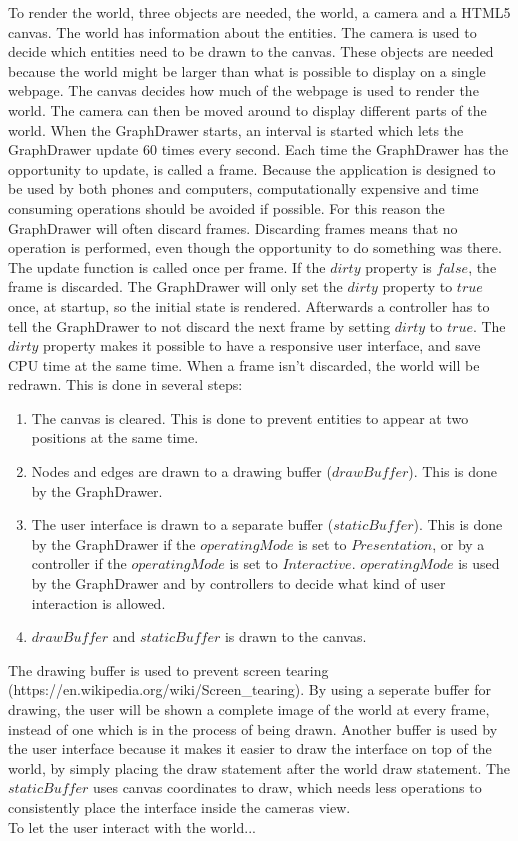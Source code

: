 To render the world, three objects are needed, the world, a camera and a HTML5 canvas. The world has information about the entities. The camera is used to decide which entities need to be drawn to the canvas. These objects are needed because the world might be larger than what is possible to display on a single webpage. The canvas decides how much of the webpage is used to render the world. The camera can then be moved around to display different parts of the world. When the GraphDrawer starts, an interval is started which lets the GraphDrawer update 60 times every second. Each time the GraphDrawer has the opportunity to update, is called a frame. Because the application is designed to be used by both phones and computers, computationally expensive and time consuming operations should be avoided if possible. For this reason the GraphDrawer will often discard frames. Discarding frames means that no operation is performed, even though the opportunity to do something was there. The update function is called once per frame. If the $dirty$ property is $false$, the frame is discarded. The GraphDrawer will only set the $dirty$ property to $true$ once, at startup, so the initial state is rendered. Afterwards a controller has to tell the GraphDrawer to not discard the next frame by setting $dirty$ to $true$. The $dirty$ property makes it possible to have a responsive user interface, and save CPU time at the same time. When a frame isn't discarded, the world will be redrawn. This is done in several steps:
\begin{enumerate}
    \item The canvas is cleared. This is done to prevent entities to appear at two positions at the same time.
    \item Nodes and edges are drawn to a drawing buffer ($drawBuffer$). This is done by the GraphDrawer.
    \item The user interface is drawn to a separate buffer ($staticBuffer$). This is done by the GraphDrawer if the $operatingMode$ is set to $Presentation$, or by a controller if the $operatingMode$ is set to $Interactive$. $operatingMode$ is used by the GraphDrawer and by controllers to decide what kind of user interaction is allowed.
    \item $drawBuffer$ and $staticBuffer$ is drawn to the canvas.
\end{enumerate}
The drawing buffer is used to prevent screen tearing (https://en.wikipedia.org/wiki/Screen\_tearing). By using a seperate buffer for drawing, the user will be shown a complete image of the world at every frame, instead of one which is in the process of being drawn. Another buffer is used by the user interface because it makes it easier to draw the interface on top of the world, by simply placing the draw statement after the world draw statement. The $staticBuffer$ uses canvas coordinates to draw, which needs less operations to consistently place the interface inside the cameras view.
\\[11pt]
To let the user interact with the world...








